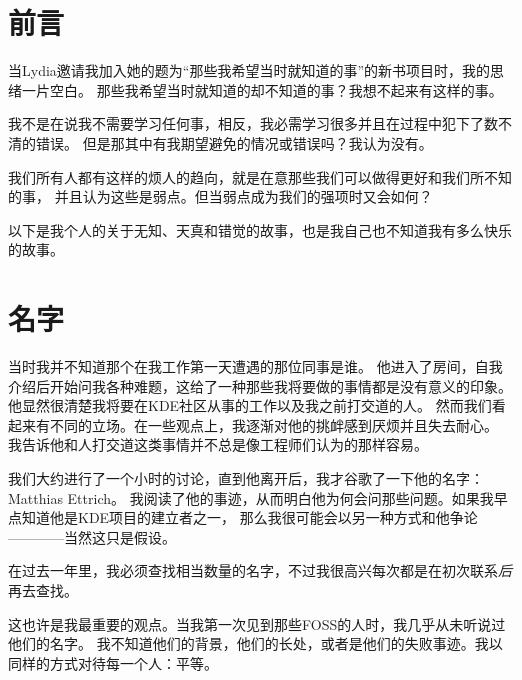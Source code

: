 

\section*{前言}

当Lydia邀请我加入她的题为“那些我希望当时就知道的事”的新书项目时，我的思绪一片空白。
那些我希望当时就知道的却不知道的事？我想不起来有这样的事。

我不是在说我不需要学习任何事，相反，我必需学习很多并且在过程中犯下了数不清的错误。
但是那其中有我期望避免的情况或错误吗？我认为没有。

我们所有人都有这样的烦人的趋向，就是在意那些我们可以做得更好和我们所不知的事，
并且认为这些是弱点。但当弱点成为我们的强项时又会如何？

以下是我个人的关于无知、天真和错觉的故事，也是我自己也不知道我有多么快乐的故事。

\section*{名字}

当时我并不知道那个在我工作第一天遭遇的那位同事是谁。
他进入了房间，自我介绍后开始问我各种难题，这给了一种那些我将要做的事情都是没有意义的印象。
他显然很清楚我将要在KDE社区从事的工作以及我之前打交道的人。
然而我们看起来有不同的立场。在一些观点上，我逐渐对他的挑衅感到厌烦并且失去耐心。
我告诉他和人打交道这类事情并不总是像工程师们认为的那样容易。

我们大约进行了一个小时的讨论，直到他离开后，我才谷歌了一下他的名字：Matthias Ettrich。
我阅读了他的事迹，从而明白他为何会问那些问题。如果我早点知道他是KDE项目的建立者之一，
那么我很可能会以另一种方式和他争论————当然这只是假设。

在过去一年里，我必须查找相当数量的名字，不过我很高兴每次都是在初次联系\textit{后}再去查找。

这也许是我最重要的观点。当我第一次见到那些FOSS的人时，我几乎从未听说过他们的名字。
我不知道他们的背景，他们的长处，或者是他们的失败事迹。我以同样的方式对待每一个人：平等。

